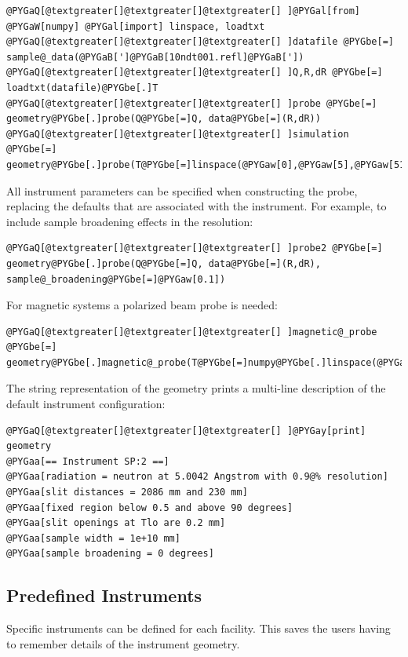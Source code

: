 \documentclass[letterpaper,10pt,english]{sphinxmanual}
\begin{document}
\begin{Verbatim}[commandchars=@\[\]]
@PYGaQ[@textgreater[]@textgreater[]@textgreater[] ]@PYGal[from] @PYGaW[numpy] @PYGal[import] linspace, loadtxt
@PYGaQ[@textgreater[]@textgreater[]@textgreater[] ]datafile @PYGbe[=] sample@_data(@PYGaB[']@PYGaB[10ndt001.refl]@PYGaB['])
@PYGaQ[@textgreater[]@textgreater[]@textgreater[] ]Q,R,dR @PYGbe[=] loadtxt(datafile)@PYGbe[.]T
@PYGaQ[@textgreater[]@textgreater[]@textgreater[] ]probe @PYGbe[=] geometry@PYGbe[.]probe(Q@PYGbe[=]Q, data@PYGbe[=](R,dR))
@PYGaQ[@textgreater[]@textgreater[]@textgreater[] ]simulation @PYGbe[=] geometry@PYGbe[.]probe(T@PYGbe[=]linspace(@PYGaw[0],@PYGaw[5],@PYGaw[51]))
\end{Verbatim}

All instrument parameters can be specified when constructing the probe,
replacing the defaults that are associated with the instrument.  For
example, to include sample broadening effects in the resolution:

\begin{Verbatim}[commandchars=@\[\]]
@PYGaQ[@textgreater[]@textgreater[]@textgreater[] ]probe2 @PYGbe[=] geometry@PYGbe[.]probe(Q@PYGbe[=]Q, data@PYGbe[=](R,dR), sample@_broadening@PYGbe[=]@PYGaw[0.1])
\end{Verbatim}

For magnetic systems a polarized beam probe is needed:

\begin{Verbatim}[commandchars=@\[\]]
@PYGaQ[@textgreater[]@textgreater[]@textgreater[] ]magnetic@_probe @PYGbe[=] geometry@PYGbe[.]magnetic@_probe(T@PYGbe[=]numpy@PYGbe[.]linspace(@PYGaw[0],@PYGaw[5],@PYGaw[100]))
\end{Verbatim}

The string representation of the geometry prints a multi-line
description of the default instrument configuration:

\begin{Verbatim}[commandchars=@\[\]]
@PYGaQ[@textgreater[]@textgreater[]@textgreater[] ]@PYGay[print] geometry
@PYGaa[== Instrument SP:2 ==]
@PYGaa[radiation = neutron at 5.0042 Angstrom with 0.9@% resolution]
@PYGaa[slit distances = 2086 mm and 230 mm]
@PYGaa[fixed region below 0.5 and above 90 degrees]
@PYGaa[slit openings at Tlo are 0.2 mm]
@PYGaa[sample width = 1e+10 mm]
@PYGaa[sample broadening = 0 degrees]
\end{Verbatim}


\subsection{Predefined Instruments}
\label{api/instrument:predefined-instruments}
Specific instruments can be defined for each facility.  This saves the users
having to remember details of the instrument geometry.
\end{document}
